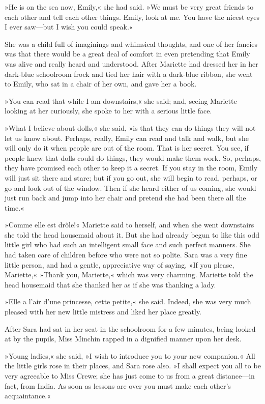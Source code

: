 »He is on the sea now, Emily,« she had said. »We must be very great friends to each other and tell each other things. Emily, look at me. You have the nicest eyes I ever saw—but I wish you could speak.«

She was a child full of imaginings and whimsical thoughts, and one of her fancies was that there would be a great deal of comfort in even pretending that Emily was alive and really heard and understood. After Mariette had dressed her in her dark-blue schoolroom frock and tied her hair with a dark-blue ribbon, she went to Emily, who sat in a chair of her own, and gave her a book.

»You can read that while I am downstairs,« she said; and, seeing Mariette looking at her curiously, she spoke to her with a serious little face.

»What I believe about dolls,« she said, »is that they can do things they will not let us know about. Perhaps, really, Emily can read and talk and walk, but she will only do it when people are out of the room. That is her secret. You see, if people knew that dolls could do things, they would make them work. So, perhaps, they have promised each other to keep it a secret. If you stay in the room, Emily will just sit there and stare; but if you go out, she will begin to read, perhaps, or go and look out of the window. Then if she heard either of us coming, she would just run back and jump into her chair and pretend she had been there all the time.«

»\textfrench{Comme elle est drôle!}« Mariette said to herself, and when she went downstairs she told the head housemaid about it. But she had already begun to like this odd little girl who had such an intelligent small face and such perfect manners. She had taken care of children before who were not so polite. Sara was a very fine little person, and had a gentle, appreciative way of saying, »If you please, Mariette,« »Thank you, Mariette,« which was very charming. Mariette told the head housemaid that she thanked her as if she was thanking a lady.

»\textfrench{Elle a l'air d'une princesse, cette petite,}« she said. Indeed, she was very much pleased with her new little mistress and liked her place greatly.

After Sara had sat in her seat in the schoolroom for a few minutes, being looked at by the pupils, Miss Minchin rapped in a dignified manner upon her desk.

»Young ladies,« she said, »I wish to introduce you to your new companion.« All the little girls rose in their places, and Sara rose also. »I shall expect you all to be very agreeable to Miss Crewe; she has just come to us from a great distance—in fact, from India. As soon as lessons are over you must make each other's acquaintance.«


